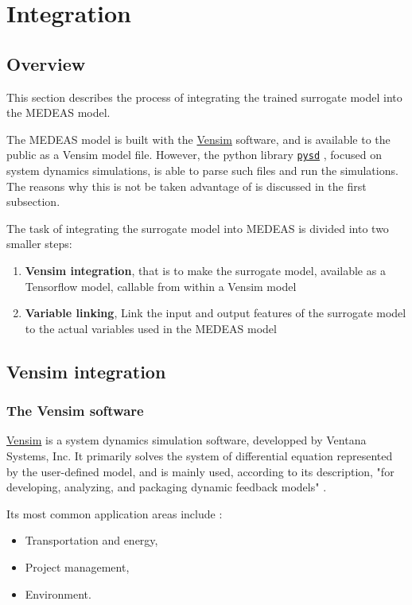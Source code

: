 \section{Integration}

\subsection{Overview}

This section describes the process of integrating the trained surrogate model into the MEDEAS model.

The MEDEAS model is built with the \href{https://vensim.com/}{Vensim} software, and is available to the public as a Vensim model file. However, the python library \href{https://pysd.readthedocs.io/en/master/index.html}{\texttt{pysd}} \cite{pysd}, focused on system dynamics simulations, is able to parse such files and run the simulations. The reasons why this is not be taken advantage of is discussed in the first subsection.

The task of integrating the surrogate model into MEDEAS is divided into two smaller steps:
\begin{enumerate}
    \item \textbf{Vensim integration}, that is to make the surrogate model, available as a Tensorflow model, callable from within a Vensim model
    \item \textbf{Variable linking}, Link the input and output features of the surrogate model to the actual variables used in the MEDEAS model
\end{enumerate}

\subsection{Vensim integration}

\subsubsection{The Vensim software}

\href{https://vensim.com/}{Vensim} is a system dynamics simulation software, developped by Ventana Systems, Inc. It primarily solves the system of differential equation represented by the user-defined model, and is mainly used, according to its description, "for developing, analyzing, and packaging dynamic feedback models" \cite{vensim-website}.

Its most common application areas include \cite{wiki-vensim}:
\begin{itemize}
    \item Transportation and energy,
    \item Project management,
    \item Environment.
\end{itemize}

